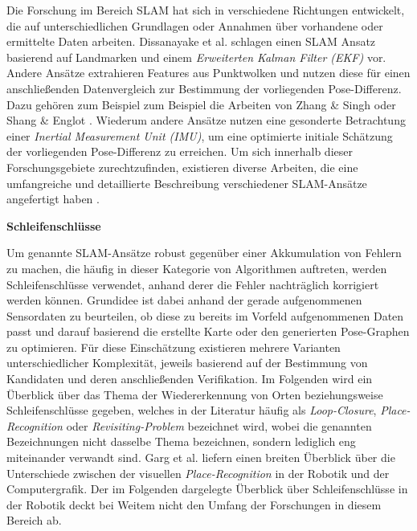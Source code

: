Die Forschung im Bereich SLAM hat sich in verschiedene Richtungen entwickelt, die auf unterschiedlichen Grundlagen oder Annahmen über vorhandene oder ermittelte Daten arbeiten. Dissanayake et al. \cite{dissanayake2001solution} schlagen einen SLAM Ansatz basierend auf Landmarken und einem \emph{Erweiterten Kalman Filter (EKF)} vor. Andere Ansätze extrahieren Features aus Punktwolken und nutzen diese für einen anschließenden Datenvergleich zur Bestimmung der vorliegenden Pose-Differenz. Dazu gehören zum Beispiel zum Beispiel die Arbeiten von Zhang \& Singh \cite{zhang2014loam} oder Shang \& Englot \cite{shan2018lego}. Wiederum andere Ansätze nutzen eine gesonderte Betrachtung einer \emph{Inertial Measurement Unit (IMU)}, um eine optimierte initiale Schätzung der vorliegenden Pose-Differenz zu erreichen. Um sich innerhalb dieser Forschungsgebiete zurechtzufinden, existieren diverse Arbeiten, die eine umfangreiche und detaillierte Beschreibung verschiedener SLAM-Ansätze angefertigt haben \cite{cadena2016past, aulinas2008slam, taketomi2017visual}. 


\textbf{Schleifenschlüsse}

Um genannte SLAM-Ansätze robust gegenüber einer Akkumulation von Fehlern zu machen, die häufig in dieser Kategorie von Algorithmen auftreten, werden Schleifenschlüsse verwendet, anhand derer die Fehler nachträglich korrigiert werden können. Grundidee ist dabei anhand der gerade aufgenommenen Sensordaten zu beurteilen, ob diese zu bereits im Vorfeld aufgenommenen Daten passt und darauf basierend die erstellte Karte oder den generierten Pose-Graphen zu optimieren. Für diese Einschätzung existieren mehrere Varianten unterschiedlicher Komplexität, jeweils basierend auf der Bestimmung von Kandidaten und deren anschließenden Verifikation. Im Folgenden wird ein Überblick über das Thema der Wiedererkennung von Orten beziehungsweise Schleifenschlüsse gegeben, welches in der Literatur häufig als \emph{Loop-Closure}, \emph{Place-Recognition} oder \emph{Revisiting-Problem} bezeichnet wird, wobei die genannten Bezeichnungen nicht dasselbe Thema bezeichnen, sondern lediglich eng miteinander verwandt sind. Garg et al. \cite{garg2021your} liefern einen breiten Überblick über die Unterschiede zwischen der visuellen \emph{Place-Recognition} in der Robotik und der Computergrafik. Der im Folgenden dargelegte Überblick über Schleifenschlüsse in der Robotik deckt bei Weitem nicht den Umfang der Forschungen in diesem Bereich ab. 

